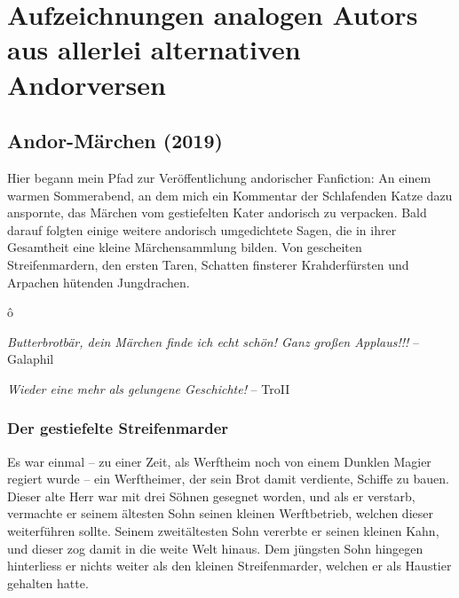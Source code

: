 \documentclass[10pt, a4paper, oneside]{book}
\newcommand{\nurvollversion}[1]{#1} %
\newcommand{\trennzeichen}{%
        \begin{center}%
            \vspace*{-1em}
            \andorfont\Huge{ô}
        \end{center}
    }
\begin{document}
%


%


%



\part{Aufzeichnungen analogen Autors aus allerlei alternativen Andorversen}


\begin{chapterbox}
    \chapter{Andor-Märchen (2019)}

    Hier begann mein Pfad zur Veröffentlichung andorischer Fanfiction: An einem warmen Sommerabend, an dem mich ein Kommentar der Schlafenden Katze dazu anspornte, das Märchen vom gestiefelten Kater andorisch zu verpacken. Bald darauf folgten einige weitere andorisch umgedichtete Sagen, die in ihrer Gesamtheit eine kleine Märchensammlung bilden. Von gescheiten Streifenmardern, den ersten Taren, Schatten finsterer Krahderfürsten und Arpachen hütenden Jungdrachen.

    \trennzeichen

    \nurvollversion{
        \textit{Butterbrotbär, dein Märchen finde ich echt schön! Ganz großen Applaus!!!}
        \newline
        – Galaphil
        \bigskip

        \textit{Wieder eine mehr als gelungene Geschichte!}
        \newline
        – TroII
    }

\end{chapterbox}


\extramarks{}{ }

\newpage

\section{Der gestiefelte Streifenmarder}


Es war einmal – zu einer Zeit, als Werftheim noch von einem Dunklen Magier regiert wurde – ein Werftheimer, der sein Brot damit verdiente, Schiffe zu bauen. Dieser alte Herr war mit drei Söhnen gesegnet worden, und als er verstarb, vermachte er seinem ältesten Sohn seinen kleinen Werftbetrieb, welchen dieser weiterführen sollte. Seinem zweitältesten Sohn vererbte er seinen kleinen Kahn, und dieser zog damit in die weite Welt hinaus. Dem jüngsten Sohn hingegen hinterliess er nichts weiter als den kleinen Streifenmarder, welchen er als Haustier gehalten hatte.
\end{document}

